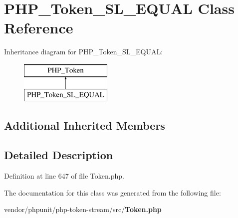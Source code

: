 \section{P\+H\+P\+\_\+\+Token\+\_\+\+S\+L\+\_\+\+E\+Q\+U\+A\+L Class Reference}
\label{class_p_h_p___token___s_l___e_q_u_a_l}
Inheritance diagram for P\+H\+P\+\_\+\+Token\+\_\+\+S\+L\+\_\+\+E\+Q\+U\+A\+L\+:\begin{figure}[H]
\begin{center}
\leavevmode
\includegraphics[height=2.000000cm]{class_p_h_p___token___s_l___e_q_u_a_l}
\end{center}
\end{figure}
\subsection*{Additional Inherited Members}


\subsection{Detailed Description}


Definition at line 647 of file Token.\+php.



The documentation for this class was generated from the following file\+:\begin{DoxyCompactItemize}
\item 
vendor/phpunit/php-\/token-\/stream/src/{\bf Token.\+php}\end{DoxyCompactItemize}

